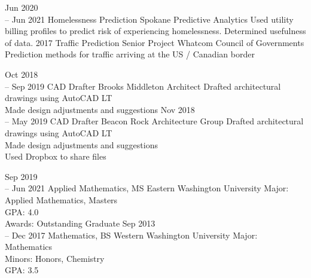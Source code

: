 \documentclass[11pt]{developercv} %
\begin{document}
\vspace{0.5cm}



\begin{entrylist}
	\entry
	    {Jun 2020 \\
		-- Jun 2021}
	    {Homelessness Prediction}
	    {Spokane Predictive Analytics}
	    {Used utility billing profiles to predict risk of experiencing homelessness. Determined usefulness of data.}
	\entry
		{2017}
		{Traffic Prediction Senior Project}
		{Whatcom Council of Governments}
		{Prediction methods for traffic arriving at the US / Canadian border}
\end{entrylist}



\begin{entrylist}
	\entry
		{Oct 2018 \\
		-- Sep 2019}
		{CAD Drafter}
		{Brooks Middleton Architect}
		{Drafted architectural drawings using AutoCAD LT \\ 
		Made design adjustments and suggestions}
	\entry
		{Nov 2018 \\
		-- May 2019}
		{CAD Drafter}
		{Beacon Rock Architecture Group}
		{Drafted architectural drawings using AutoCAD LT \\ 
		Made design adjustments and suggestions \\
		Used Dropbox to share files}
\end{entrylist}



\begin{entrylist}
	\entry
		{Sep 2019\\
		-- Jun 2021}
		{Applied Mathematics, MS}
		{Eastern Washington University}
		{Major: Applied Mathematics, Masters \\
		GPA: 4.0 \\
		Awards: Outstanding Graduate
		}
	\entry
		{Sep 2013\\
		-- Dec 2017}
		{Mathematics, BS}
		{Western Washington University}
		{Major: Mathematics \\
		Minors: Honors, Chemistry \\
		GPA: 3.5
		}
\end{entrylist}
\end{document}
